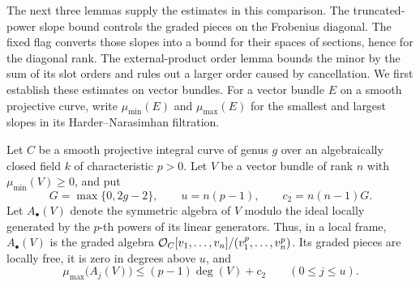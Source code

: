 The next three lemmas supply the estimates in this comparison. The
truncated-power slope bound controls the graded pieces on the
Frobenius diagonal. The fixed flag converts those slopes into a bound
for their spaces of sections, hence for the diagonal rank. The
external-product order lemma bounds the minor by the sum of its slot
orders and rules out a larger order caused by cancellation.
We first establish these estimates on vector bundles.  For a vector bundle $E$ on a smooth
projective curve, write $\mu_{\min}(E)$ and $\mu_{\max}(E)$ for the smallest
and largest slopes in its Harder--Narasimhan filtration.

\begin{lemma}\label{lem:frob-truncated-slopes}
Let $C$ be a smooth projective integral curve of genus $g$ over an
algebraically closed field $k$ of characteristic $p>0$.  Let $V$ be a vector
bundle of rank $n$ with $\mu_{\min}(V)\ge0$, and put
\[
 G=\max\{0,2g-2\},\qquad u=n(p-1),\qquad c_2=n(n-1)G.
\]
Let $A_\bullet(V)$ denote the symmetric algebra of $V$ modulo the ideal
locally generated by the $p$-th powers of its linear generators.  Thus, in
a local frame, $A_\bullet(V)$ is the graded algebra
$\mathcal O_C[v_1,\ldots,v_n]/(v_1^p,\ldots,v_n^p)$.  Its graded pieces are locally
free, it is zero in degrees above $u$, and
\begin{equation}\label{eq:frob-truncated-upper-slope}
 \mu_{\max}\bigl(A_j(V)\bigr)
 \le (p-1)\deg(V)+c_2
 \qquad (0\le j\le u).
\end{equation}
\end{lemma}

